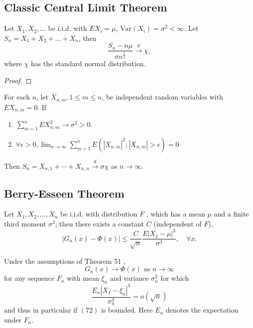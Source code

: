 \subsection{Classic Central Limit Theorem}

\begin{theorem}
	Let $X_1,X_2,\ldots$ be i.i.d. with $EX_i=\mu$, $\text{Var}(X_i)=\sigma^2<\infty$. Let $S_n=X_1+X_2+\ldots+X_n$, then
	\begin{equation}
		\frac{S_n-n\mu}{\sigma n^{\frac{1}{2}}} \stackrel{d}{\rightarrow} \chi,
	\end{equation}
	where $\chi$ has the standard normal distribution.
\end{theorem}

\begin{proof}

\end{proof}

\begin{theorem}
	For each $n$, let $X_{n,m},1\leq m\leq n$, be independent random variables with $EX_{n,m}=0$. If
	\begin{enumerate}
		\item $\sum_{m=1}^{n}EX_{n,m}^{2} \rightarrow \sigma^{2}>0$.
		\item $\forall\epsilon>0,\lim_{n\rightarrow\infty}\sum_{m=1}^{n}E\left(\left|X_{n,m}\right|^{2};\left|X_{n,m}\right|>\epsilon\right)=0$
	\end{enumerate}
	Then $S_{n}=X_{n,1}+\cdots+X_{n,n}\stackrel{d}{\rightarrow}\sigma\chi$ as $n\rightarrow\infty$.
\end{theorem}

\subsection{Berry-Esseen Theorem}

\begin{theorem}
	Let $X_{1},X_{2},\ldots,X_{n}$ be i.i.d. with distribution $F$ , which has a mean $\mu$ and a finite third moment $\sigma^{3}$, then there exists a constant $C$ (independent of $F$),
	\begin{equation}
		\left|G_{n}(x)-\Phi(x)\right|\leq\frac{C}{\sqrt{n}}\frac{E\left|X_{1}-\mu\right|^{3}}{\sigma^{3}},\quad\forall x.
	\end{equation}
\end{theorem}

\begin{corollary}
	Under the assumptions of Theorem 51 ,
	$$
		G_{n}(x) \rightarrow \Phi(x) \text { as } n \rightarrow \infty
	$$
	for any sequence $F_{n}$ with mean $\xi_{n}$ and variance $\sigma_{n}^{2}$ for which
	$$
		\frac{E_{n}\left|X_{1}-\xi_{n}\right|^{3}}{\sigma_{n}^{3}}=o(\sqrt{n})
	$$
	and thus in particular if $(72)$ is bounded. Here $E_{n}$ denotes the expectation under $F_{n}$.
\end{corollary}

